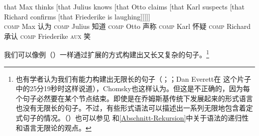 \addlines[2]
\ea
\label{ex-that-max-thinks-that-recursion}
\gll that          Max thinks [that                 Julius knows [that Otto claims [that Karl suspects [that Richard confirms [that Friederike is laughing]]]]]\\
     \textsc{comp} Max 认为    \spacebr\textsc{comp} Julius 知道  \spacebr\textsc{comp} Otto 声称 \spacebr\textsc{comp} Karl 怀疑 \spacebr\textsc{comp} Richard 承认 \spacebr\textsc{comp} Friederike \textsc{aux} 笑\\
\z

\noindent
我们可以像例（）一样通过扩展的方式构建出又长又复杂的句子。\footnote{%
也有学者认为我们有能力构建出无限长的句子（\citealp*[]{NKN2001a}；\citealp[]{KS2008a-u}；Dan Everett在 这个片子中的25分19秒时这样说道），Chomsky也这样认为\citep[]{Leiss2003a}。但这是不正确的，因为每个句子必然要在某个节点结束。即使是在乔姆斯基传统下发展起来的形式语言也没有无限长的句子。不过，有些形式语法可以描述出一系列无限地包含着定式句子的情况。（\citealp[]{Chomsky57a}）也可以参见 和\ref{Abschnitt-Rekursion}中关于语法的递归性和语言无限论的观点。
}

